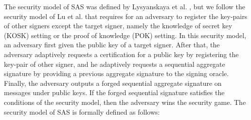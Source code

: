 \documentclass[11pt,letterpaper]{article}
\begin{document}
The security model of SAS was defined by Lysyanskaya et al.
\cite{LysyanskayaMRS04}, but we follow the security model of Lu et al.
\cite{LuOSSW06} that requires for an adversary to register the key-pairs of
other signers except the target signer, namely the knowledge of secret key
(KOSK) setting or the proof of knowledge (POK) setting. In this security
model, an adversary first given the public key of a target signer. After
that, the adversary adaptively requests a certification for a public key by
registering the key-pair of other signer, and he adaptively requests a
sequential aggregate signature by providing a previous aggregate signature to
the signing oracle. Finally, the adversary outputs a forged sequential
aggregate signature on messages under public keys. If the forged sequential
signature satisfies the conditions of the security model, then the adversary
wins the security game. The security model of SAS is formally defined as
follows:
\end{document}
